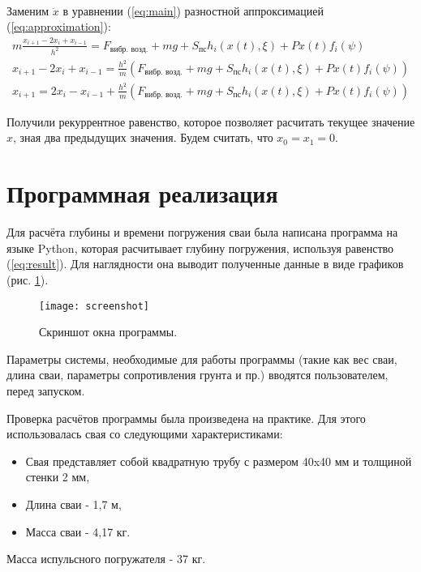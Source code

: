 ~\

\noindent Заменим $\ddot{x}$ в уравнении (\ref{eq:main}) разностной аппроксимацией (\ref{eq:approximation}):
\begin{equation}
    \label{eq:result}
    \begin{aligned}
        m\frac{x_{i+1} - 2x_i + x_{i-1}}{h^2} = F_\text{вибр. возд.} + mg + S_\text{пс} h_i(x(t), \xi)+ P x(t) f_i(\psi)\\
        x_{i+1} - 2x_i + x_{i-1} = \frac{h^2}{m}(F_\text{вибр. возд.} + mg + S_\text{пс} h_i(x(t), \xi) + P x(t) f_i(\psi))\\
        x_{i+1} = 2x_i - x_{i-1} + \frac{h^2}{m}(F_\text{вибр. возд.} + mg + S_\text{пс} h_i(x(t), \xi) + P x(t) f_i(\psi))
    \end{aligned}
\end{equation}

\noindent Получили рекуррентное равенство, которое позволяет расчитать текущее значение $x$, зная два предыдущих значения. Будем
считать, что $x_0 = x_1 = 0$.

\clearpage

\section{Программная реализация}

Для расчёта глубины и времени погружения сваи была написана программа на языке Python, которая расчитывает глубину
погружения, используя равенство (\ref{eq:result}). Для наглядности она выводит полученные данные в виде графиков
(рис. \ref{fig:screenshot}).

\begin{figure}[ht]
    \centering
    \texttt{[image: screenshot]}
    \caption{Скриншот окна программы.}
    \label{fig:screenshot}
\end{figure}

\noindent Параметры системы, необходимые для работы программы (такие как вес сваи, длина сваи, параметры сопротивления грунта
и пр.) вводятся пользователем, перед запуском.

Проверка расчётов программы была произведена на практике. Для этого использовалась свая со следующими характеристиками:
\begin{itemize}
    \item Свая представляет собой квадратную трубу с размером 40x40 мм и толщиной стенки 2 мм,
    \item Длина сваи - 1,7 м,
    \item Масса сваи - 4,17 кг.
\end{itemize}
Масса испульсного погружателя - 37 кг.

